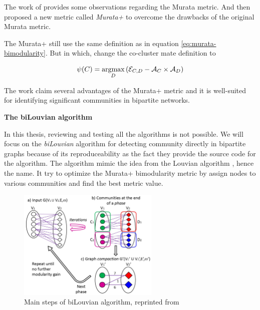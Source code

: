 The work of \cite{pesantez2018} provides some observations regarding the Murata metric.
And then proposed a new metric called \textit{Murata+} to overcome the drawbacks of the original Murata metric.

The Murata+ still use the same definition as in equation \ref{eq:murata-bimodularity}.
But in which, change the co-cluster mate definition to

\begin{equation}
	\psi(C) = \operatorname*{argmax}_D \left(\mathcal{E}_{C, D} - \mathcal{A}_C \times \mathcal{A}_D\right)
\end{equation}

The work claim several advantages of the Murata+ metric and it is well-suited for identifying significant communities in bipartite networks.

\textbf{The biLouvian algorithm}

In this thesis, reviewing and testing all the algorithms is not possible.
We will focus on the \textit{biLouvian} algorithm \cite{pesantez2018} for detecting community directly in bipartite graphs
because of its reproduceability as the fact they provide the source code for the algorithm.
The algorithm mimic the idea from the Louvian algorithm \cite{blondel2008}, hence the name.
It try to optimize the Murata+ bimodularity metric by assign nodes to various communities and find the best metric value.



\begin{figure}[H]
	\centering
	\includegraphics[width=0.6\textwidth]{images/biLouvian-algorithm.png}
	\caption{Main steps of biLouvian algorithm, reprinted from \cite{pesantez2018}}
	\label{fig:biLouvian-algorithm}
\end{figure}

